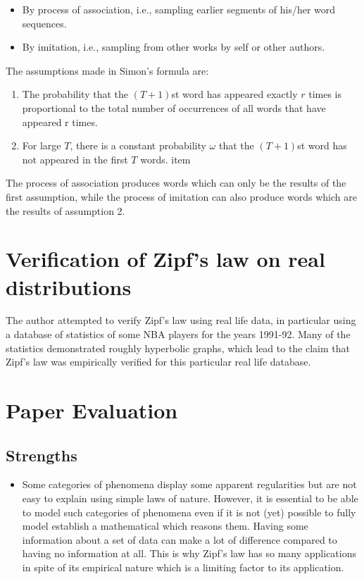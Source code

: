 \documentclass{article} \usepackage{hyperref} \usepackage{graphicx}
\begin{document}
\begin{itemize}
  \item By process of association, i.e., sampling earlier segments of
    his/her word sequences.
  \item By imitation, i.e., sampling from other works by self or other
    authors.
\end{itemize}

The assumptions made in Simon's formula are:
\begin{enumerate}
   \item The probability that the $(T + 1)$st word has appeared exactly $r$
     times is proportional to the total number of occurrences of all words
     that have appeared r times.
   \item For large $T$, there is a constant probability $ω$ that the $(T +
     1)$st word has not appeared in the first $T$ words. item
\end{enumerate}

The process of association produces words which can only be the results of
the first assumption, while the process of imitation can also produce words
which are the results of assumption 2.

\section{Verification of Zipf's law on real distributions}

The author attempted to verify Zipf's law using real life data, in
particular using a database of statistics of some NBA players for the years
1991-92. Many of the statistics demonstrated roughly hyperbolic graphs,
which lead to the claim that Zipf's law was empirically verified for this
particular real life database.

\section{Paper Evaluation}
\subsection{Strengths}
\begin{itemize}
\item Some categories of phenomena display some apparent regularities but
  are not easy to explain using simple laws of nature. However, it is
  essential to be able to model such categories of phenomena even if it is
  not (yet) possible to fully model establish a mathematical which reasons
  them. Having some information about a set of data can make a lot of
  difference compared to having no information at all. This is why Zipf's
  law has so many applications in spite of its empirical nature which is a
  limiting factor to its application.
\end{itemize}
\end{document}

